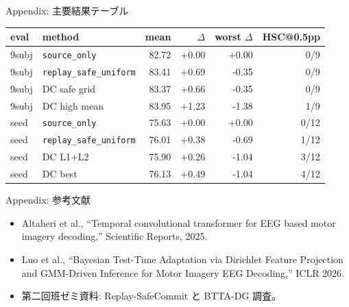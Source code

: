 \documentclass[unicode,aspectratio=169,12pt]{beamer}
\makeatletter
\newcommand{\hsc}{HSC@0.5pp}
\newcommand{\source}{\texttt{source\_only}}
\newcommand{\replay}{\texttt{replay\_safe\_uniform}}
\makeatother
\begin{document}
\begin{frame}{Appendix: 主要結果テーブル}
  \scriptsize
  \begin{table}
    \centering
    \begin{tabular}{llrrrr}
      \toprule
      eval & method & mean & $\Delta$ & worst $\Delta$ & \hsc \\
      \midrule
      9subj & \source & 82.72 & +0.00 & +0.00 & 0/9 \\
      9subj & \replay & 83.41 & +0.69 & -0.35 & 0/9 \\
      9subj & DC safe grid & 83.37 & +0.66 & -0.35 & 0/9 \\
      9subj & DC high mean & 83.95 & +1.23 & -1.38 & 1/9 \\
      \midrule
      seed & \source & 75.63 & +0.00 & +0.00 & 0/12 \\
      seed & \replay & 76.01 & +0.38 & -0.69 & 1/12 \\
      seed & DC L1+L2 & 75.90 & +0.26 & -1.04 & 3/12 \\
      seed & DC best & 76.13 & +0.49 & -1.04 & 4/12 \\
      \bottomrule
    \end{tabular}
  \end{table}
\end{frame}

\begin{frame}{Appendix: 参考文献}
  \small
  \begin{itemize}
    \item Altaheri et al., ``Temporal convolutional transformer for EEG based motor imagery decoding,'' Scientific Reports, 2025.
    \item Luo et al., ``Bayesian Test-Time Adaptation via Dirichlet Feature Projection and GMM-Driven Inference for Motor Imagery EEG Decoding,'' ICLR 2026.
    \item 第二回班ゼミ資料: Replay-SafeCommit と BTTA-DG 調査。
  \end{itemize}
\end{frame}
\end{document}
